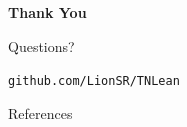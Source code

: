 \documentclass[aspectratio=169,10pt]{beamer}
\begin{document}
{%
\begin{frame}
    \begin{center}
        \vspace{2em}
        \Huge\textbf{\textcolor{leangreen}{Thank You}}

        \vspace{1.2em}
        \LARGE Questions?

        \vspace{1.5em}
        \large\texttt{github.com/LionSR/TNLean}
    \end{center}
\end{frame}
}

\begin{frame}[allowframebreaks]{References}

\end{frame}
\end{document}
